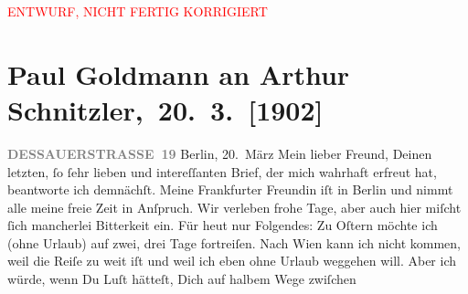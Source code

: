 
\begin{center}
            \textcolor{red}{ENTWURF, NICHT FERTIG KORRIGIERT}
                      \end{center}
            
         
         \renewcommand{\erwaehntePersonen}{Personen: Richard Beer-Hofmann, Theodore Rottenberg, Olga Schnitzler}
         \renewcommand{\erwaehnteInstitutionen}{Institutionen: Houghton Library}
         \renewcommand{\erwaehnteOrte}{Orte: Berlin, Dessauer Straße, Frankfurt am Main, Hinterbrühl, Prag, Wien}
         \renewcommand{\erwaehnteWerke}{}
               \section[ Paul Goldmann an Arthur Schnitzler, 20. 3. {[}1902{]}]{ Paul Goldmann an Arthur Schnitzler, 20. 3. {[}1902{]}}\nopagebreak{}\rehead{ }\begin{ledgroupsized}[t]{13cm}\normalsize\beginnumbering \toendnotes[C]{\smallbreak\pagebreak[2]} 
\toendnotes[C]{\smallbreak}\pstart
           \noindent{}\raggedleft{}{\pb}\textcolor{gray}{\textbf{DESSAUERSTRASSE 19}}\pend
           \pstart
           Berlin, 20. März\pend
           \pstart\center{}Mein lieber Freund,\pend\pstart
           Deinen letzten, ſo ſehr lieben und intereſſanten Brief, der mich wahrhaft erfreut
               hat, beantworte ich demnächſt. Meine Frankfurter
                  Freundin iſt in Berlin und nimmt alle meine freie Zeit in Anſpruch. Wir
               verleben frohe Tage, aber auch hier miſcht ſich mancherlei Bitterkeit ein.\pend
           \pstart
           Für heut nur Folgendes: Zu Oſtern möchte ich (ohne
               Urlaub) auf zwei, drei Tage fortreiſen. Nach Wien
               kann ich nicht kommen, weil die Reiſe zu weit iſt und weil ich eben ohne Urlaub
               weggehen will. Aber ich würde, wenn Du Luſt hätteſt, Dich auf halbem Wege zwiſchen

\end{ledgroupsized}
